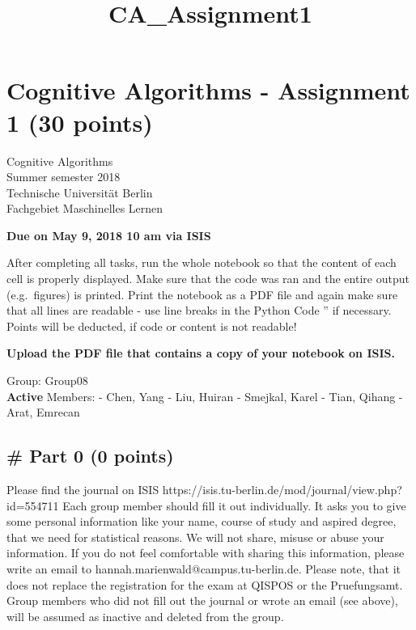 \documentclass[11pt]{article}
\title{CA\_Assignment1}
\begin{document}
    
    
    \maketitle
    
    

    
    \hypertarget{cognitive-algorithms---assignment-1-30-points}{%
\section{Cognitive Algorithms - Assignment 1 (30
points)}\label{cognitive-algorithms---assignment-1-30-points}}

Cognitive Algorithms\\
Summer semester 2018\\
Technische Universität Berlin\\
Fachgebiet Maschinelles Lernen

\textbf{Due on May 9, 2018 10 am via ISIS }

After completing all tasks, run the whole notebook so that the content
of each cell is properly displayed. Make sure that the code was ran and
the entire output (e.g.~figures) is printed. Print the notebook as a PDF
file and again make sure that all lines are readable - use line breaks
in the Python Code '' if necessary. Points will be deducted, if code or
content is not readable!

\textbf{Upload the PDF file that contains a copy of your notebook on
ISIS.}

    Group: Group08\\
\textbf{Active} Members: - Chen, Yang - Liu, Huiran - Smejkal, Karel -
Tian, Qihang - Arat, Emrecan

    \hypertarget{part-0-0-points}{%
\subsection{\# Part 0 (0 points)}\label{part-0-0-points}}

Please find the journal on ISIS
https://isis.tu-berlin.de/mod/journal/view.php?id=554711 Each group
member should fill it out individually. It asks you to give some
personal information like your name, course of study and aspired degree,
that we need for statistical reasons. We will not share, misuse or abuse
your information. If you do not feel comfortable with sharing this
information, please write an email to
hannah.marienwald@campus.tu-berlin.de. Please note, that it does not
replace the registration for the exam at QISPOS or the Pruefungsamt.\\
Group members who did not fill out the journal or wrote an email (see
above), will be assumed as inactive and deleted from the group.
\end{document}
